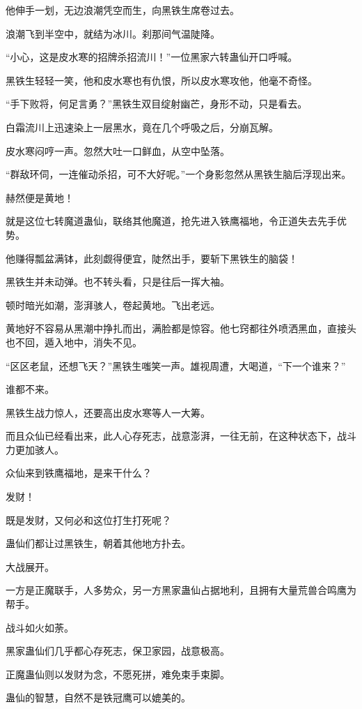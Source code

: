 \begin{this_body}
他伸手一划，无边浪潮凭空而生，向黑铁生席卷过去。

浪潮飞到半空中，就结为冰川。刹那间气温陡降。

“小心，这是皮水寒的招牌杀招流川！”一位黑家六转蛊仙开口呼喊。

黑铁生轻轻一笑，他和皮水寒也有仇恨，所以皮水寒攻他，他毫不奇怪。

“手下败将，何足言勇？”黑铁生双目绽射幽芒，身形不动，只是看去。

白霜流川上迅速染上一层黑水，竟在几个呼吸之后，分崩瓦解。

皮水寒闷哼一声。忽然大吐一口鲜血，从空中坠落。

“群敌环伺，一连催动杀招，可不大好呢。”一个身影忽然从黑铁生脑后浮现出来。

赫然便是黄地！

就是这位七转魔道蛊仙，联络其他魔道，抢先进入铁鹰福地，令正道失去先手优势。

他赚得瓢盆满钵，此刻觑得便宜，陡然出手，要斩下黑铁生的脑袋！

黑铁生并未动弹。也不转头看，只是往后一挥大袖。

顿时暗光如潮，澎湃骇人，卷起黄地。飞出老远。

黄地好不容易从黑潮中挣扎而出，满脸都是惊容。他七窍都往外喷洒黑血，直接头也不回，遁入地中，消失不见。

“区区老鼠，还想飞天？”黑铁生嗤笑一声。雄视周遭，大喝道，“下一个谁来？”

谁都不来。

黑铁生战力惊人，还要高出皮水寒等人一大筹。

而且众仙已经看出来，此人心存死志，战意澎湃，一往无前，在这种状态下，战斗力更加骇人。

众仙来到铁鹰福地，是来干什么？

发财！

既是发财，又何必和这位打生打死呢？

蛊仙们都让过黑铁生，朝着其他地方扑去。

大战展开。

一方是正魔联手，人多势众，另一方黑家蛊仙占据地利，且拥有大量荒兽合鸣鹰为帮手。

战斗如火如荼。

黑家蛊仙们几乎都心存死志，保卫家园，战意极高。

正魔蛊仙则以发财为念，不愿死拼，难免束手束脚。

蛊仙的智慧，自然不是铁冠鹰可以媲美的。


\end{this_body}
